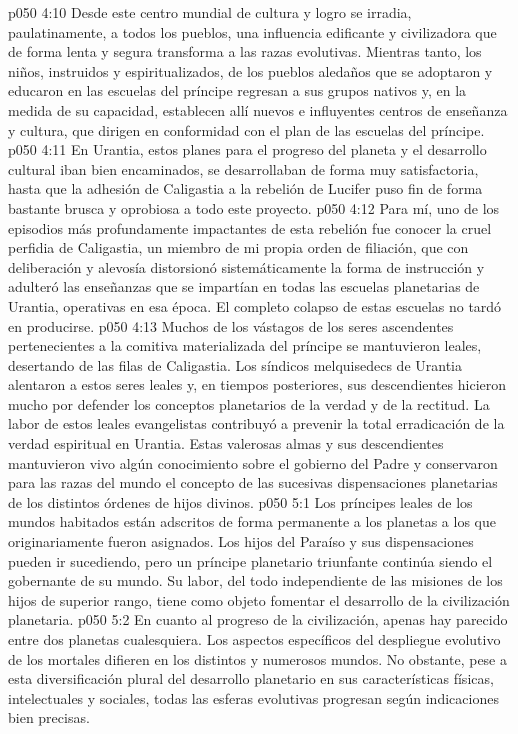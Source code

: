 \vs p050 4:10 Desde este centro mundial de cultura y logro se irradia, paulatinamente, a todos los pueblos, una influencia edificante y civilizadora que de forma lenta y segura transforma a las razas evolutivas. Mientras tanto, los niños, instruidos y espiritualizados, de los pueblos aledaños que se adoptaron y educaron en las escuelas del príncipe regresan a sus grupos nativos y, en la medida de su capacidad, establecen allí nuevos e influyentes centros de enseñanza y cultura, que dirigen en conformidad con el plan de las escuelas del príncipe.
\vs p050 4:11 \pc En Urantia, estos planes para el progreso del planeta y el desarrollo cultural iban bien encaminados, se desarrollaban de forma muy satisfactoria, hasta que la adhesión de Caligastia a la rebelión de Lucifer puso fin de forma bastante brusca y oprobiosa a todo este proyecto.
\vs p050 4:12 Para mí, uno de los episodios más profundamente impactantes de esta rebelión fue conocer la cruel perfidia de Caligastia, un miembro de mi propia orden de filiación, que con deliberación y alevosía distorsionó sistemáticamente la forma de instrucción y adulteró las enseñanzas que se impartían en todas las escuelas planetarias de Urantia, operativas en esa época. El completo colapso de estas escuelas no tardó en producirse.
\vs p050 4:13 Muchos de los vástagos de los seres ascendentes pertenecientes a la comitiva materializada del príncipe se mantuvieron leales, desertando de las filas de Caligastia. Los síndicos melquisedecs de Urantia alentaron a estos seres leales y, en tiempos posteriores, sus descendientes hicieron mucho por defender los conceptos planetarios de la verdad y de la rectitud. La labor de estos leales evangelistas contribuyó a prevenir la total erradicación de la verdad espiritual en Urantia. Estas valerosas almas y sus descendientes mantuvieron vivo algún conocimiento sobre el gobierno del Padre y conservaron para las razas del mundo el concepto de las sucesivas dispensaciones planetarias de los distintos órdenes de hijos divinos.
\vs p050 5:1 Los príncipes leales de los mundos habitados están adscritos de forma permanente a los planetas a los que originariamente fueron asignados. Los hijos del Paraíso y sus dispensaciones pueden ir sucediendo, pero un príncipe planetario triunfante continúa siendo el gobernante de su mundo. Su labor, del todo independiente de las misiones de los hijos de superior rango, tiene como objeto fomentar el desarrollo de la civilización planetaria.
\vs p050 5:2 En cuanto al progreso de la civilización, apenas hay parecido entre dos planetas cualesquiera. Los aspectos específicos del despliegue evolutivo de los mortales difieren en los distintos y numerosos mundos. No obstante, pese a esta diversificación plural del desarrollo planetario en sus características físicas, intelectuales y sociales, todas las esferas evolutivas progresan según indicaciones bien precisas.
